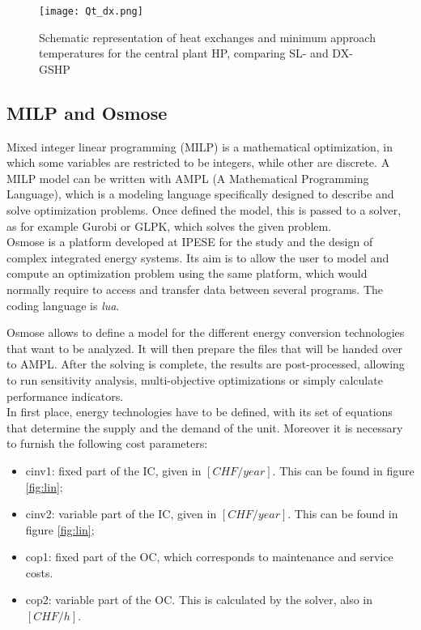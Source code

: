 \documentclass{article}
\begin{document}
\begin{figure}[htp]
	\centering
	\texttt{[image: Qt\_dx.png]}
	\caption{Schematic representation of heat exchanges and minimum approach temperatures for the central plant HP, comparing SL- and DX-GSHP}
	\label{fig:Qt_dx}
\end{figure}


\subsection{MILP and Osmose}\label{ss:osmose}

Mixed integer linear programming (MILP) is a mathematical optimization, in which some variables are restricted to be integers, while other are discrete. A MILP model can be written with AMPL (A Mathematical Programming Language), which is a modeling language specifically designed to describe and solve optimization problems. Once defined the model, this is passed to a solver, as for example Gurobi or GLPK, which solves the given problem.\\

Osmose is a platform developed at IPESE for the study and the design of complex integrated energy systems. Its aim is to allow the user to model and compute an optimization problem using the same platform, which would normally require to access and transfer data between several programs. The coding language is \textit{lua}.

Osmose allows to define a model for the different energy conversion technologies that want to be analyzed. It will then prepare the files that will be handed over to AMPL. After the solving is complete, the results are post-processed, allowing to run sensitivity analysis, multi-objective optimizations or simply calculate performance indicators.\\

In first place, energy technologies have to be defined, with its set of equations that determine the supply and the demand of the unit. Moreover it is necessary to furnish the following cost parameters:
\begin{itemize}
	\item cinv1: fixed part of the IC, given in $[CHF/year]$. This can be found in figure \ref{fig:lin};
	\item cinv2: variable part of the IC, given in $[CHF/year]$. This can be found in figure \ref{fig:lin};
	\item cop1: fixed part of the OC, which corresponds to maintenance and service costs. 
	\item cop2: variable part of the OC. This is calculated by the solver, also in $[CHF/h]$.
\end{itemize}
\end{document}
